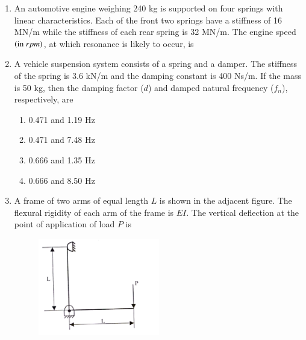 \documentclass[journal]{IEEEtran}
\begin{document}
\begin{enumerate}[leftmargin=0pt]
\item An automotive engine weighing 240 kg is supported on four springs with linear characteristics. Each of the front two springs have a stiffness of 16 MN/m while the stiffness of each rear spring is 32 MN/m. The engine speed $\left(\text{in}\  rpm\right)$, at which resonance is likely to occur, is
\begin{enumerate}
\hfill{}
\end{enumerate}

\item A vehicle suspension system consists of a spring and a damper. The stiffness of the spring is 3.6 kN/m and the damping constant is 400 Ns/m. If the mass is 50 kg, then the damping factor ($d$) and damped natural frequency ($f_n$), respectively, are
\begin{enumerate}
  \item 0.471 and 1.19 Hz
  \item 0.471 and 7.48 Hz
  \item 0.666 and 1.35 Hz
  \item 0.666 and 8.50 Hz
\hfill{}
\end{enumerate}

\item A frame of two arms of equal length $L$ is shown in the adjacent figure. The flexural rigidity of each arm of the frame is $EI$. The vertical deflection at the point of application of load $P$ is
\begin{figure}[h]
  \centering
  \includegraphics[width=0.5\textwidth]{Figs/image (9).png}
  \caption{}
  \label{fig:40}
\end{figure}


\end{enumerate}
\end{document}
